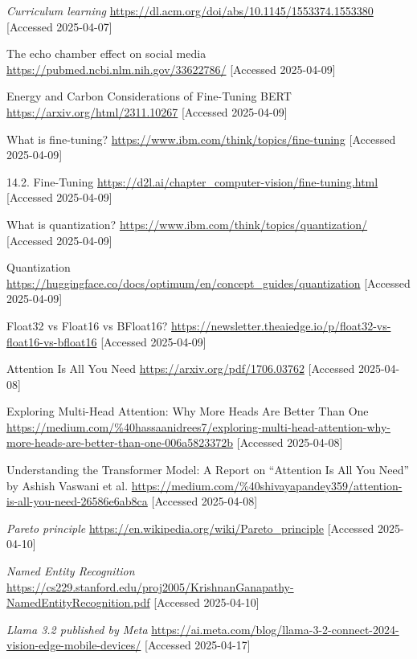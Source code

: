 \documentclass[licencjacka,en]{pracamgr}
\begin{document}
\begin{thebibliography}{199}
\textit{Curriculum learning}
\url{https://dl.acm.org/doi/abs/10.1145/1553374.1553380}
[Accessed 2025-04-07]

The echo chamber effect on social media
\url{https://pubmed.ncbi.nlm.nih.gov/33622786/}
[Accessed 2025-04-09]

Energy and Carbon Considerations of Fine-Tuning BERT
\url{https://arxiv.org/html/2311.10267}
[Accessed 2025-04-09]

What is fine-tuning?
\url{https://www.ibm.com/think/topics/fine-tuning}
[Accessed 2025-04-09]

14.2. Fine-Tuning
\url{https://d2l.ai/chapter_computer-vision/fine-tuning.html}
[Accessed 2025-04-09]

What is quantization?
\url{https://www.ibm.com/think/topics/quantization/}
[Accessed 2025-04-09]

Quantization
\url{https://huggingface.co/docs/optimum/en/concept_guides/quantization}
[Accessed 2025-04-09]

Float32 vs Float16 vs BFloat16?
\url{https://newsletter.theaiedge.io/p/float32-vs-float16-vs-bfloat16}
[Accessed 2025-04-09]

Attention Is All You Need
\url{https://arxiv.org/pdf/1706.03762} 
[Accessed 2025-04-08]

Exploring Multi-Head Attention: Why More Heads Are Better Than One
\url{https://medium.com/%40hassaanidrees7/exploring-multi-head-attention-why-more-heads-are-better-than-one-006a5823372b}
[Accessed 2025-04-08]

Understanding the Transformer Model: A Report on “Attention Is All You Need” by Ashish Vaswani et al.
\url{https://medium.com/%40shivayapandey359/attention-is-all-you-need-26586e6ab8ca}
[Accessed 2025-04-08]

\textit{Pareto principle}
\url{https://en.wikipedia.org/wiki/Pareto_principle}
[Accessed 2025-04-10]

\textit{Named Entity Recognition}
\url{https://cs229.stanford.edu/proj2005/KrishnanGanapathy-NamedEntityRecognition.pdf}
[Accessed 2025-04-10]

\textit{Llama 3.2 published by Meta}
\url{https://ai.meta.com/blog/llama-3-2-connect-2024-vision-edge-mobile-devices/}
[Accessed 2025-04-17]


\end{thebibliography}
\end{document}
